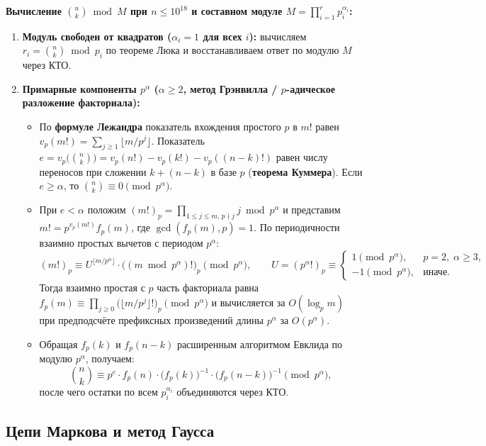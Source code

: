 \documentclass[10pt,a4paper]{article}
\renewcommand{\le}{\leqslant}
\renewcommand{\ge}{\geqslant}
\begin{document}
\textbf{Вычисление $\binom{n}{k} \bmod M$ при $n \le 10^{18}$ и составном модуле $M = \prod_{i=1}^r p_i^{\alpha_i}$:}
\begin{enumerate}
  \item \textbf{Модуль свободен от квадратов ($\alpha_i = 1$ для всех $i$):} вычисляем $r_i = \binom{n}{k} \bmod p_i$ по теореме Люка и восстанавливаем ответ по модулю $M$ через КТО.
  \item \textbf{Примарные компоненты $p^\alpha$ ($\alpha \ge 2$, метод Грэнвилла / $p$-адическое разложение факториала):}
  \begin{itemize}
    \item По \textbf{формуле Лежандра} показатель вхождения простого $p$ в $m!$ равен $v_p(m!) = \sum_{j \ge 1} \lfloor m / p^j \rfloor$. Показатель $e = v_p\bigl(\binom{n}{k}\bigr) = v_p(n!) - v_p(k!) - v_p((n - k)!)$ равен числу переносов при сложении $k + (n - k)$ в базе $p$ (\textbf{теорема Куммера}). Если $e \ge \alpha$, то $\binom{n}{k} \equiv 0 \pmod{p^\alpha}$.
    \item При $e < \alpha$ положим $(m!)_p = \prod_{1 \le j \le m,\, p \nmid j} j \bmod p^\alpha$ и представим $m! = p^{v_p(m!)} f_p(m)$, где $\gcd(f_p(m), p) = 1$. По периодичности взаимно простых вычетов с периодом $p^\alpha$:
    \[
      (m!)_p \equiv U^{\lfloor m / p^\alpha \rfloor} \cdot \bigl((m \bmod p^\alpha)!\bigr)_p \pmod{p^\alpha}, \qquad
      U = (p^\alpha!)_p \equiv \begin{cases} 1 \pmod{p^\alpha}, & p = 2,\; \alpha \ge 3, \\ -1 \pmod{p^\alpha}, & \text{иначе.} \end{cases}
    \]
    Тогда взаимно простая с $p$ часть факториала равна $f_p(m) \equiv \prod_{j \ge 0} \bigl(\lfloor m / p^j \rfloor !\bigr)_p \pmod{p^\alpha}$ и вычисляется за $O(\log_p m)$ при предподсчёте префиксных произведений длины $p^\alpha$ за $O(p^\alpha)$.
    \item Обращая $f_p(k)$ и $f_p(n - k)$ расширенным алгоритмом Евклида по модулю $p^\alpha$, получаем:
    \[
      \binom{n}{k} \equiv p^e \cdot f_p(n) \cdot \bigl(f_p(k)\bigr)^{-1} \cdot \bigl(f_p(n - k)\bigr)^{-1} \pmod{p^\alpha},
    \]
    после чего остатки по всем $p_i^{\alpha_i}$ объединяются через КТО.
  \end{itemize}
\end{enumerate}

\subsection{Цепи Маркова и метод Гаусса}
\end{document}
